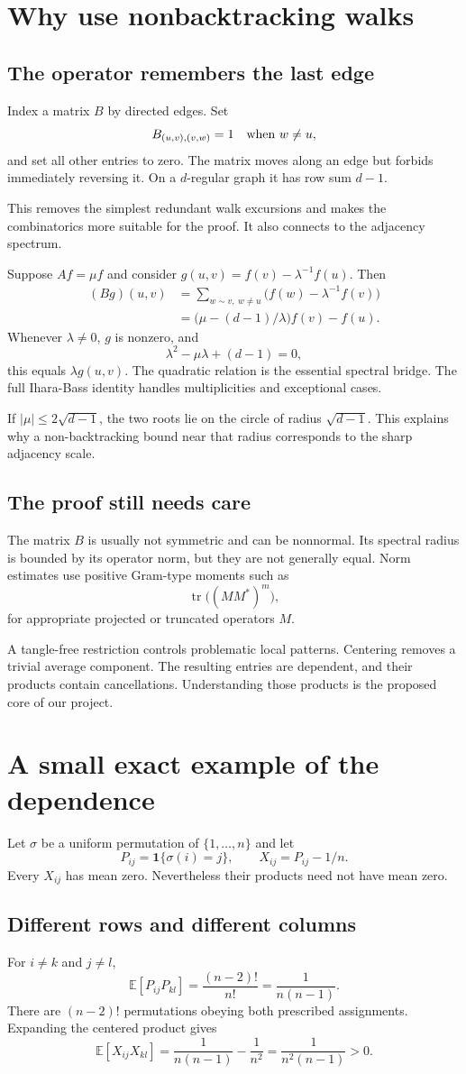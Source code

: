 \documentclass[11pt,letterpaper]{article}
\newcommand{\Page}[1]{\clearpage\section*{#1}}
\newcommand{\Sub}[1]{\subsection*{#1}}
\newcommand{\E}{\mathbb E}
\begin{document}
\Page{Why use nonbacktracking walks}
\Sub{The operator remembers the last edge}
Index a matrix $B$ by directed edges. Set
\[
 B_{(u,v),(v,w)}=1\quad\hbox{when }w\ne u,
\]
and set all other entries to zero. The matrix moves along an edge but forbids immediately reversing it. On a $d$-regular graph it has row sum $d-1$.

This removes the simplest redundant walk excursions and makes the combinatorics more suitable for the proof. It also connects to the adjacency spectrum.

Suppose $Af=\mu f$ and consider $g(u,v)=f(v)-\lambda^{-1}f(u)$. Then
\begin{align*}
 (Bg)(u,v)&=\sum_{w\sim v,\ w\ne u}
                  \big(f(w)-\lambda^{-1}f(v)\big)\\
 &=\big(\mu-(d-1)/\lambda\big)f(v)-f(u).
\end{align*}
Whenever $\lambda\ne0$, $g$ is nonzero, and
\[
 \lambda^2-\mu\lambda+(d-1)=0,
\]
this equals $\lambda g(u,v)$. The quadratic relation is the essential spectral bridge. The full Ihara-Bass identity handles multiplicities and exceptional cases.

If $|\mu|\leq2\sqrt{d-1}$, the two roots lie on the circle of radius $\sqrt{d-1}$. This explains why a non-backtracking bound near that radius corresponds to the sharp adjacency scale.

\Sub{The proof still needs care}
The matrix $B$ is usually not symmetric and can be nonnormal. Its spectral radius is bounded by its operator norm, but they are not generally equal. Norm estimates use positive Gram-type moments such as
\[
 \operatorname{tr}\big((MM^*)^m\big),
\]
for appropriate projected or truncated operators $M$.

A tangle-free restriction controls problematic local patterns. Centering removes a trivial average component. The resulting entries are dependent, and their products contain cancellations. Understanding those products is the proposed core of our project.

\Page{A small exact example of the dependence}
Let $\sigma$ be a uniform permutation of $\{1,\ldots,n\}$ and let
\[
 P_{ij}=\mathbf1\{\sigma(i)=j\},\qquad
 X_{ij}=P_{ij}-1/n.
\]
Every $X_{ij}$ has mean zero. Nevertheless their products need not have mean zero.

\Sub{Different rows and different columns}
For $i\ne k$ and $j\ne l$,
\[
 \E[P_{ij}P_{kl}]=\frac{(n-2)!}{n!}
                 =\frac{1}{n(n-1)}.
\]
There are $(n-2)!$ permutations obeying both prescribed assignments. Expanding the centered product gives
\[
 \E[X_{ij}X_{kl}]=\frac{1}{n(n-1)}-\frac{1}{n^2}
                 =\frac{1}{n^2(n-1)}>0.
\]
\end{document}
